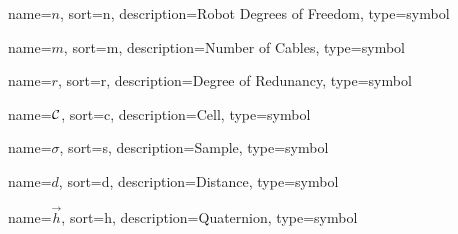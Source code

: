 	{%
		name=\ensuremath{n},
		sort=n,
		description=Robot Degrees of Freedom,
		type=symbol
	}
	\newcommand{\robotdof}{\gls{sym:robotdof}}

	{%
		name=\ensuremath{m},
		sort=m,
		description=Number of Cables,
		type=symbol
	}
	\newcommand{\numcables}{\gls{sym:numcables}}

	{%
		name=\ensuremath{r},
		sort=r,
		description=Degree of Redunancy,
		type=symbol
	}
	\newcommand{\degofredundancy}{\gls{sym:degofredundancy}}

	{%
		name=\ensuremath{\set{C}},
		sort=c,
		description=Cell,
		type=symbol
	}
	\newcommand{\cell}{\gls{sym:cell}}

	{%
		name=\ensuremath{\sigma},
		sort=s,
		description=Sample,
		type=symbol
	}
	\newcommand{\sample}{\gls{sym:sample}}

	{%
		name=\ensuremath{d},
		sort=d,
		description=Distance,
		type=symbol
	}
	\newcommand{\distance}{\gls{sym:distance}}

	{%
		name=\ensuremath{\vec{h}},
		sort=h,
		description=Quaternion,
		type=symbol
	}
	\newcommand{\quaternion}{\gls{sym:quaternion}}

